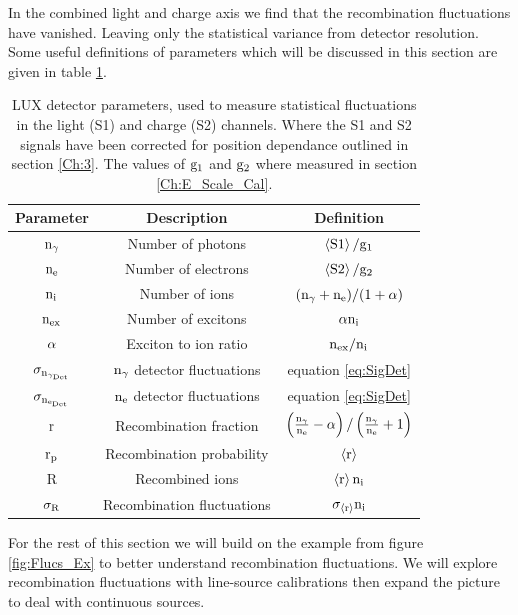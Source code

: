 \noindent In the combined light and charge axis we find that the recombination fluctuations have vanished. Leaving only the statistical variance from detector resolution. Some useful definitions of parameters which will be discussed in this section are given in table \ref{table:Fluc_Param}.

\renewcommand{\baselinestretch}{2}
\small\normalsize
\begin{table}[h!]
\begin{center}
\begin{tabular}{|c|c|c|}
\hline
Parameter & Description & Definition \\ \hline
$\rm n_\gamma$ & Number of photons & $\rm \left<S1\right>/g_1$ \\ \hline
$\rm n_e$ & Number of electrons & $\rm \left<S2\right>/g_2$ \\ \hline
$\rm n_i$ & Number of ions & $\rm (n_\gamma+n_e)/(1+\alpha)$ \\ \hline
$\rm n_{ex}$ & Number of excitons & $\rm \alpha n_{i}$ \\ \hline
$\rm \alpha$ & Exciton to ion ratio & $\rm n_{ex}/n_{i}$ \\ \hline
$\rm \sigma_{n_{\gamma_{Det}}}$ &$\rm n_\gamma$ detector fluctuations & equation \ref{eq:SigDet} \\ \hline
$\rm \sigma_{n_{e_{Det}}}$ &$\rm n_e$ detector fluctuations  & equation \ref{eq:SigDet} \\ \hline
$\rm r$ & Recombination fraction &  $\rm \left(\frac{n_\gamma}{n_e} - \alpha \right)/\left(\frac{n_\gamma}{n_e}+1\right)$ \\ \hline
$\rm r_p$ & Recombination probability & $\rm \left<r\right>$ \\ \hline
R & Recombined ions &  $\rm \left<r\right>n_{i}$ \\ \hline
$\rm \sigma_{R}$ & Recombination fluctuations &  $\rm \sigma_{\left<r\right>}n_{i}$ \\ \hline
\end{tabular}
\caption{LUX detector parameters, used to measure statistical fluctuations in the light (S1) and charge (S2) channels. Where the S1 and S2 signals have been corrected for position dependance outlined in section \ref{Ch:3}. The values of $\rm g_1$ and $\rm g_2$ where measured in section \ref{Ch:E_Scale_Cal}. }
\label{table:Fluc_Param}
\end{center}
\end{table}
\renewcommand{\baselinestretch}{2}
\small\normalsize

For the rest of this section we will build on the example from figure \ref{fig:Flucs_Ex} to better understand recombination fluctuations. We will explore recombination fluctuations with line-source calibrations then expand the picture to deal with continuous sources. 

